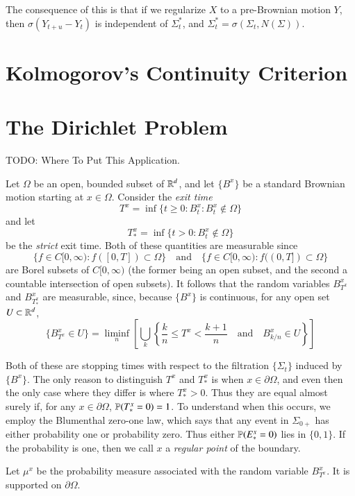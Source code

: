The consequence of this is that if we regularize $X$ to a \cadlag pre-Brownian motion $Y$, then $\sigma(Y_{t+u} - Y_t)$ is independent of $\Sigma^*_t$, and $\Sigma^*_t = \sigma(\Sigma_t, N(\Sigma))$.

\section{Kolmogorov's Continuity Criterion}




\section{The Dirichlet Problem}

TODO: Where To Put This Application.

Let $\Omega$ be an open, bounded subset of $\operatorname{\mathbb{R}}^d$, and let $\{ B^x \}$ be a standard Brownian motion starting at $x \in \Omega$. Consider the \emph{exit time}
%
\[ T^x = \inf \{ t \geq 0: B^x_t : B^x_t \not \in \Omega \} \]
%
and let
%
\[ T^x_* = \inf \{ t > 0 : B^x_t \not \in \Omega \} \]
%
be the \emph{strict} exit time. Both of these quantities are measurable since
%
\[ \{ f \in C[0,\infty) : f([0,T]) \subset \Omega \} \quad\text{and}\quad \{ f \in C[0,\infty) : f((0,T]) \subset \Omega \} \]
%
are Borel subsets of $C[0,\infty)$ (the former being an open subset, and the second a countable intersection of open subsets). It follows that the random variables $B^x_{T^x}$ and $B^x_{T^x_*}$ are measurable, since, because $\{ B^x \}$ is continuous, for any open set $U \subset \operatorname{\mathbb{R}}^d$,
%
\[ \{ B^x_{T^x} \in U \} = \liminf_n \left[ \bigcup_k \left\{ \frac{k}{n} \leq T^x < \frac{k+1}{n} \quad\text{and}\quad B^x_{k/n} \in U \right\} \right] \]



Both of these are stopping times with respect to the filtration $\{ \Sigma_t \}$ induced by $\{ B^x \}$. The only reason to distinguish $T^x$ and $T^x_*$ is when $x \in \partial \Omega$, and even then the only case where they differ is where $T^x_* > 0$. Thus they are equal almost surely if, for any $x \in \partial \Omega$, $\operatorname{\mathbb{P}}(T^x_* = 0) = 1$. To understand when this occurs, we employ the Blumenthal zero-one law, which says that any event in $\Sigma_{0+}$ has either probability one or probability zero. Thus either $\operatorname{\mathbb{P}}(E^x_* = 0)$ lies in $\{ 0, 1 \}$. If the probability is one, then we call $x$ a \emph{regular point} of the boundary.

Let $\mu^x$ be the probability measure associated with the random variable $B^x_{T^x}$. It is supported on $\partial \Omega$.

